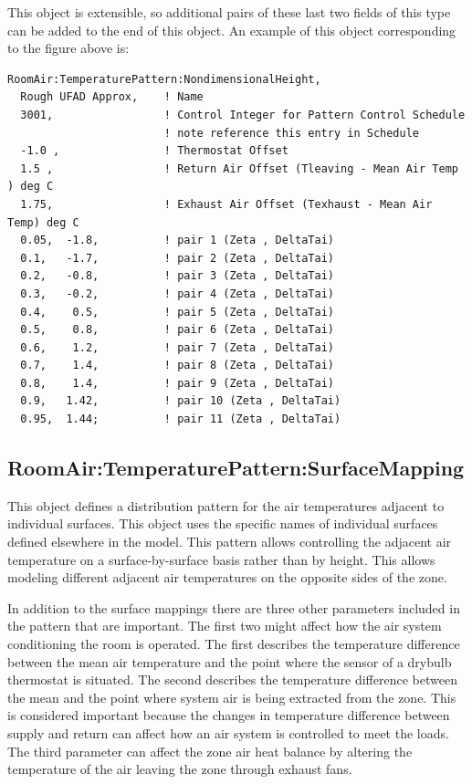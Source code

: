 This object is extensible, so additional pairs of these last two fields of this type can be added to the end of this object. An example of this object corresponding to the figure above is:

\begin{lstlisting}
RoomAir:TemperaturePattern:NondimensionalHeight,
  Rough UFAD Approx,    ! Name
  3001,                 ! Control Integer for Pattern Control Schedule
                        ! note reference this entry in Schedule
  -1.0 ,                ! Thermostat Offset
  1.5 ,                 ! Return Air Offset (Tleaving - Mean Air Temp ) deg C
  1.75,                 ! Exhaust Air Offset (Texhaust - Mean Air Temp) deg C
  0.05,  -1.8,          ! pair 1 (Zeta , DeltaTai)
  0.1,   -1.7,          ! pair 2 (Zeta , DeltaTai)
  0.2,   -0.8,          ! pair 3 (Zeta , DeltaTai)
  0.3,   -0.2,          ! pair 4 (Zeta , DeltaTai)
  0.4,    0.5,          ! pair 5 (Zeta , DeltaTai)
  0.5,    0.8,          ! pair 6 (Zeta , DeltaTai)
  0.6,    1.2,          ! pair 7 (Zeta , DeltaTai)
  0.7,    1.4,          ! pair 8 (Zeta , DeltaTai)
  0.8,    1.4,          ! pair 9 (Zeta , DeltaTai)
  0.9,   1.42,          ! pair 10 (Zeta , DeltaTai)
  0.95,  1.44;          ! pair 11 (Zeta , DeltaTai)
\end{lstlisting}

\subsection{RoomAir:TemperaturePattern:SurfaceMapping}\label{roomairtemperaturepatternsurfacemapping}

This object defines a distribution pattern for the air temperatures adjacent to individual surfaces. This object uses the specific names of individual surfaces defined elsewhere in the model. This pattern allows controlling the adjacent air temperature on a surface-by-surface basis rather than by height. This allows modeling different adjacent air temperatures on the opposite sides of the zone.

In addition to the surface mappings there are three other parameters included in the pattern that are important. The first two might affect how the air system conditioning the room is operated. The first describes the temperature difference between the mean air temperature and the point where the sensor of a drybulb thermostat is situated. The second describes the temperature difference between the mean and the point where system air is being extracted from the zone. This is considered important because the changes in temperature difference between supply and return can affect how an air system is controlled to meet the loads. The third parameter can affect the zone air heat balance by altering the temperature of the air leaving the zone through exhaust fans.

